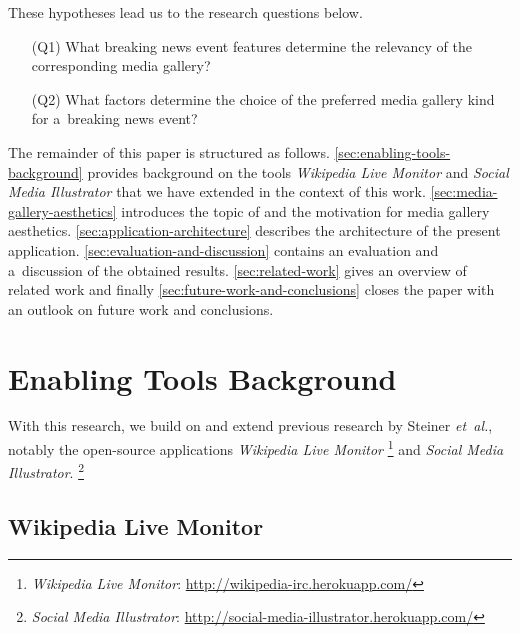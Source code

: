\documentclass{sig-alternate}
\newcommand{\inlinelistingsize}{\fontsize{8pt}{11pt}}
\let\oldurl\url
\renewcommand{\url}[1]{\inlinelistingsize\oldurl{#1}}
\begin{document}
\noindent These hypotheses lead us to the research questions below.

\begin{itemize}
  \itemsep0em
  \item[(Q1)] What breaking news event features
    determine the relevancy of the corresponding media gallery?
  \item[(Q2)] What factors determine the choice
    of the preferred media gallery kind for a~breaking news event?
\end{itemize}

The remainder of this paper is structured as follows.
\autoref{sec:enabling-tools-background} provides background
on the tools \emph{Wikipedia Live Monitor} and
\emph{Social Media Illustrator} that we have extended
in the context of this work.
\autoref{sec:media-gallery-aesthetics} introduces the topic of
and the motivation for media gallery aesthetics.
\autoref{sec:application-architecture} describes the architecture
of the present application.
\autoref{sec:evaluation-and-discussion} contains an evaluation
and a~discussion of the obtained results.
\autoref{sec:related-work} gives an overview of related work
and finally \autoref{sec:future-work-and-conclusions}
closes the paper with an outlook on future work
and conclusions.

\section{Enabling Tools Background}
\label{sec:enabling-tools-background}
\selectfont

With this research, we build on and extend previous research
by Steiner \emph{et~al.}, notably
the open-source applications \emph{Wikipedia Live Monitor}%
\footnote{\emph{Wikipedia Live Monitor}:
\url{http://wikipedia-irc.herokuapp.com/}}
and \emph{Social Media Illustrator}.%
\footnote{\emph{Social Media Illustrator}:
\url{http://social-media-illustrator.herokuapp.com/}}

\subsection{Wikipedia Live Monitor}
\end{document}

